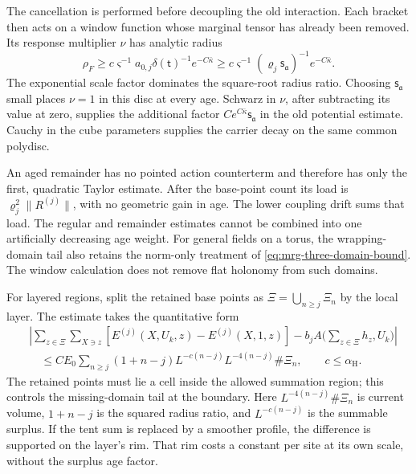 \documentclass[11pt,letterpaper,reqno]{amsart}
\theoremstyle{definition}
\theoremstyle{remark}
\begin{document}
The cancellation is performed before decoupling the old
interaction. Each bracket then acts on a window function
whose marginal tensor has already been removed. Its response
multiplier $\nu$ has analytic radius
\[
 \rho_F\ge c\varsigma^{-1}a_{0,j}
                  \delta(\mathsf t)^{-1}e^{-C\bar\kappa}
 \ge c\varsigma^{-1}
             (\varrho_j\mathsf s_{\mathfrak a})^{-1}e^{-C\bar\kappa}.
\]
The exponential scale factor dominates the square-root radius
ratio. Choosing $\mathsf s_{\mathfrak a}$ small places
$\nu=1$ in this disc at every age. Schwarz in $\nu$, after
subtracting its value at zero, supplies the additional factor
$C e^{C\bar\kappa}\mathsf s_{\mathfrak a}$ in the old
potential estimate. Cauchy in the cube parameters supplies
the carrier decay on the same common polydisc.

An aged remainder has no pointed action counterterm and
therefore has only the first, quadratic Taylor estimate.
After the base-point count its load is $\varrho_j^2\|R^{(j)}\|$,
with no geometric gain in age. The lower coupling drift
sums that load. The regular and remainder estimates cannot
be combined into one artificially decreasing age weight.
For general fields on a torus, the wrapping-domain tail also
retains the norm-only treatment of
\eqref{eq:mrg-three-domain-bound}. The window calculation
does not remove flat holonomy from such domains.

For layered regions, split the retained
base points as $\Xi=\bigcup_{n\ge j}\Xi_n$
by the local layer. The estimate takes
the quantitative form
\begin{equation}\label{eq:xrg-layered-subtraction}
 \begin{split}
 &\left|\sum_{z\in\Xi}\sum_{X\ni z}
       [E^{(j)}(X,U_k,z)-E^{(j)}(X,1,z)]
       -b_jA\Big(\sum_{z\in\Xi}h_z,U_k\Big)\right|\\
 &\quad\le CE_0\sum_{n\ge j}
        (1+n-j)L^{-c(n-j)}L^{-4(n-j)}\#\Xi_n,
                     \qquad c\le\alpha_{\mathrm H}.
 \end{split}
\end{equation}
The retained points must lie a cell inside
the allowed summation region; this controls
the missing-domain tail at the boundary.
Here $L^{-4(n-j)}\#\Xi_n$ is current
volume, $1+n-j$ is the squared radius ratio,
and $L^{-c(n-j)}$ is the summable surplus.
If the tent sum is replaced by a smoother
profile, the difference is supported on
the layer's rim. That rim costs a constant
per site at its own scale, without the
surplus age factor.
\end{document}
